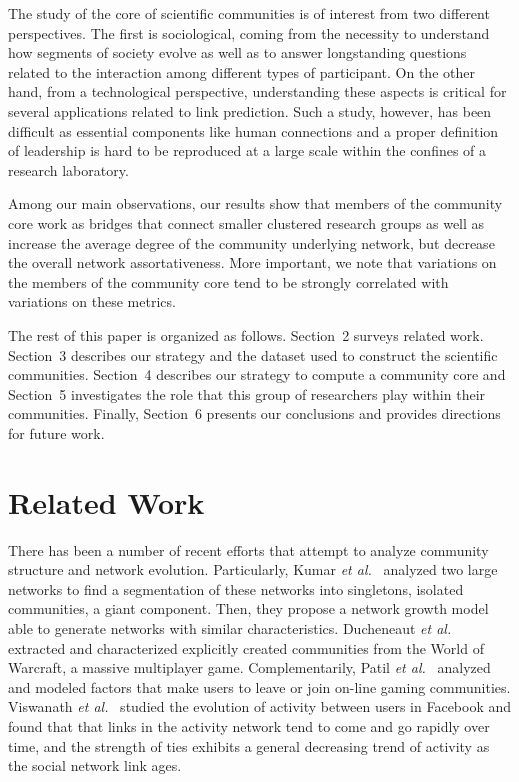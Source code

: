 \documentclass[letterpaper]{www13-companion-accepted}
\begin{document}
The study of the core of scientific communities is of interest from two different perspectives.  The first is sociological, coming from the necessity to understand how
segments of society evolve as well as to answer longstanding  questions related to the interaction among different types of participant. On the other hand, from a technological perspective,
understanding these aspects is critical for several applications related to link prediction. Such a study, however, has been difficult as essential components like human connections 
and a proper definition of leadership is hard to be reproduced at a large scale within the confines of a research laboratory.

Among our main observations, our results show that members of the community core work as bridges that connect smaller clustered research groups as well as increase the average
degree of the community underlying network, but decrease the overall network assortativeness. More important, we note that variations on the members of the community core tend to be strongly correlated
with variations on these metrics.

The rest of this paper is organized as follows. Section~2 surveys related work. Section~3 describes our strategy and the dataset used to construct the 
scientific communities.  Section~4 describes our strategy to compute a community core and Section~5 investigates the
role that this group of researchers play within their communities.  Finally, Section~6 presents our conclusions and provides directions for future work. 

% 

\section{Related Work}


There has been a number of recent efforts that attempt to analyze community structure and network evolution.  Particularly, Kumar \textit{et al.}~\cite{Kumar:2006} analyzed two large networks to
find a segmentation of these networks into singletons, isolated communities, a giant component. Then, they propose a network growth model able to generate networks with similar
characteristics.  Ducheneaut \textit{et al.}~\cite{Ducheneaut:2007} extracted and characterized explicitly created communities from the World of Warcraft, a massive multiplayer game.
Complementarily, Patil \textit{et al.}~\cite{Patil:2012} analyzed and modeled factors that make users to leave or join on-line gaming communities.  Viswanath \textit{et
al.}~\cite{Viswanath:2009} studied the evolution of activity between users in Facebook and found that that links in the activity network tend to come and go rapidly over time, and
the strength of ties exhibits a general decreasing trend of activity as the social network link ages.
\end{document}
